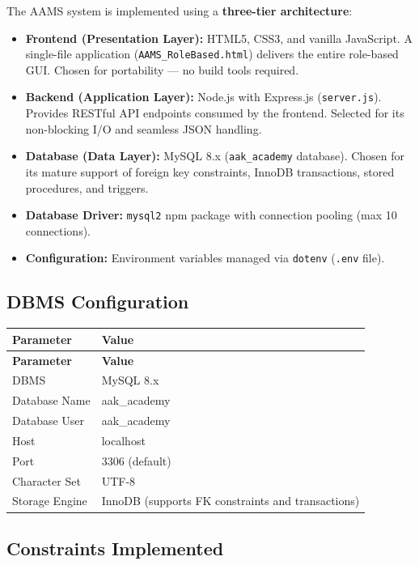 \documentclass[12pt,a4paper]{report}
\begin{document}
The AAMS system is implemented using a \textbf{three-tier architecture}:

\begin{itemize}[noitemsep]
    \item \textbf{Frontend (Presentation Layer):} HTML5, CSS3, and vanilla JavaScript. A single-file application (\texttt{AAMS\_RoleBased.html}) delivers the entire role-based GUI. Chosen for portability — no build tools required.
    \item \textbf{Backend (Application Layer):} Node.js with Express.js (\texttt{server.js}). Provides RESTful API endpoints consumed by the frontend. Selected for its non-blocking I/O and seamless JSON handling.
    \item \textbf{Database (Data Layer):} MySQL 8.x (\texttt{aak\_academy} database). Chosen for its mature support of foreign key constraints, InnoDB transactions, stored procedures, and triggers.
    \item \textbf{Database Driver:} \texttt{mysql2} npm package with connection pooling (max 10 connections).
    \item \textbf{Configuration:} Environment variables managed via \texttt{dotenv} (\texttt{.env} file).
\end{itemize}

\subsection{DBMS Configuration}

\begin{longtable}{|L{4.5cm}|L{9cm}|}
\hline
\textbf{Parameter} & \textbf{Value} \\
\hline
\endfirsthead
\hline
\textbf{Parameter} & \textbf{Value} \\
\hline
\endhead
DBMS & MySQL 8.x \\
\hline
Database Name & aak\_academy \\
\hline
Database User & aak\_academy \\
\hline
Host & localhost \\
\hline
Port & 3306 (default) \\
\hline
Character Set & UTF-8 \\
\hline
Storage Engine & InnoDB (supports FK constraints and transactions) \\
\hline
\end{longtable}

\subsection{Constraints Implemented}
\end{document}
